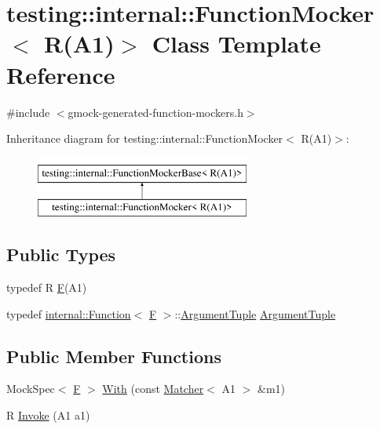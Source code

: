 \hypertarget{classtesting_1_1internal_1_1FunctionMocker_3_01R_07A1_08_4}{}\section{testing\+::internal\+::Function\+Mocker$<$ R(A1)$>$ Class Template Reference}
\label{classtesting_1_1internal_1_1FunctionMocker_3_01R_07A1_08_4}


{\ttfamily \#include $<$gmock-\/generated-\/function-\/mockers.\+h$>$}

Inheritance diagram for testing\+::internal\+::Function\+Mocker$<$ R(A1)$>$\+:\begin{figure}[H]
\begin{center}
\leavevmode
\includegraphics[height=2.000000cm]{classtesting_1_1internal_1_1FunctionMocker_3_01R_07A1_08_4}
\end{center}
\end{figure}
\subsection*{Public Types}
\begin{DoxyCompactItemize}
\item 
typedef R \mbox{\hyperlink{classtesting_1_1internal_1_1FunctionMocker_3_01R_07A1_08_4_ada54286442ab14a18c2308cef748848f}{F}}(A1)
\item 
typedef \mbox{\hyperlink{structtesting_1_1internal_1_1Function}{internal\+::\+Function}}$<$ \mbox{\hyperlink{classtesting_1_1internal_1_1FunctionMocker_3_01R_07A1_08_4_ada54286442ab14a18c2308cef748848f}{F}} $>$\+::\mbox{\hyperlink{classtesting_1_1internal_1_1FunctionMocker_3_01R_07A1_08_4_aacec6412ac4343c071d7dfe965558b0b}{Argument\+Tuple}} \mbox{\hyperlink{classtesting_1_1internal_1_1FunctionMocker_3_01R_07A1_08_4_aacec6412ac4343c071d7dfe965558b0b}{Argument\+Tuple}}
\end{DoxyCompactItemize}
\subsection*{Public Member Functions}
\begin{DoxyCompactItemize}
\item 
Mock\+Spec$<$ \mbox{\hyperlink{classtesting_1_1internal_1_1FunctionMocker_3_01R_07A1_08_4_ada54286442ab14a18c2308cef748848f}{F}} $>$ \mbox{\hyperlink{classtesting_1_1internal_1_1FunctionMocker_3_01R_07A1_08_4_acad7b9da099d38f5e37b63c430374cc8}{With}} (const \mbox{\hyperlink{classtesting_1_1Matcher}{Matcher}}$<$ A1 $>$ \&m1)
\item 
R \mbox{\hyperlink{classtesting_1_1internal_1_1FunctionMocker_3_01R_07A1_08_4_a4a58d37902572c8136d999c5008dce1a}{Invoke}} (A1 a1)
\end{DoxyCompactItemize}


